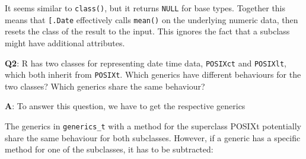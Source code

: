 \documentclass[
]{krantz}
\makeatletter
\newenvironment{Shaded}{\begin{snugshade}}{\end{snugshade}}
\newcommand{\KeywordTok}[1]{\textcolor[rgb]{0.13,0.29,0.53}{\textbf{#1}}}
\newcommand{\NormalTok}[1]{#1}
\newcommand{\OperatorTok}[1]{\textcolor[rgb]{0.81,0.36,0.00}{\textbf{#1}}}
\newcommand{\StringTok}[1]{\textcolor[rgb]{0.31,0.60,0.02}{#1}}
\newenvironment{kframe}{%
\medskip{}
\setlength{\fboxsep}{.8em}
 \def\at@end@of@kframe{}%
 \ifinner\ifhmode%
  \def\at@end@of@kframe{\end{minipage}}%
  \begin{minipage}{\columnwidth}%
 \fi\fi%
 \def\FrameCommand##1{\hskip\@totalleftmargin \hskip-\fboxsep
 \colorbox{shadecolor}{##1}\hskip-\fboxsep
     \hskip-\linewidth \hskip-\@totalleftmargin \hskip\columnwidth}%
 \MakeFramed {\advance\hsize-\width
   \@totalleftmargin\z@ \linewidth\hsize
   \@setminipage}}%
 {\par\unskip\endMakeFramed%
 \at@end@of@kframe}
\renewenvironment{Shaded}{\begin{kframe}}{\end{kframe}}
\renewcommand{\KeywordTok} [1]{\textcolor[rgb]{0.00,0.44,0.13}{{#1}}}
\renewcommand{\StringTok}  [1]{\textcolor[rgb]{0.25,0.44,0.63}{{#1}}}
\renewcommand{\NormalTok}  [1]{{#1}}
\makeatother
\begin{document}
It seems similar to \texttt{class()}, but it returns \texttt{NULL} for base types. Together this means that \texttt{{[}.Date} effectively calls \texttt{mean()} on the underlying numeric data, then resets the class of the result to the input. This ignores the fact that a subclass might have additional attributes.

\textbf{{Q2}}: R has two classes for representing date time data, \texttt{POSIXct} and \texttt{POSIXlt}, which both inherit from \texttt{POSIXt}. Which generics have different behaviours for the two classes? Which generics share the same behaviour?

\textbf{{A}}: To answer this question, we have to get the respective generics

\begin{Shaded}
\end{Shaded}

The generics in \texttt{generics\_t} with a method for the superclass POSIXt potentially share the same behaviour for both subclasses. However, if a generic has a specific method for one of the subclasses, it has to be subtracted:
\end{document}
